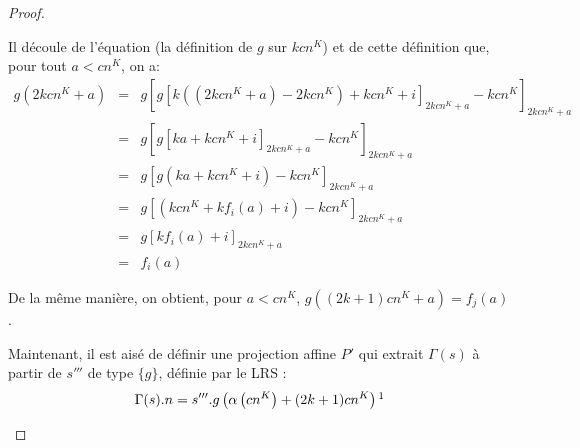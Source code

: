 \documentclass{article}
\begin{document}
\begin{proof}
\begin{enumerate}[itemsep=-1mm,leftmargin=2cm]
					Il découle de l'équation \redtext{$(\star)$} (la définition de $g$ sur $kcn^K$) et de cette définition que, pour tout $a < cn^K$, on a\footnotemark :
					\setcounter{equation}{0}
					\begin{eqnarray}
						g\left( 2kcn^K + a\right)	& = & 		g\left[ g\left[ k\left( \left(2kcn^K + a\right) - 2kcn^K \right) + kcn^K  + i\right]_{2kcn^K + a} - kcn^K  \right]_{2kcn^K + a} \\
													& = & 		g\left[ g\left[ k a + kcn^K  + i\right]_{2kcn^K + a} - kcn^K  \right]_{2kcn^K + a} \\
													& = & 		g\left[ g\left( k a + kcn^K  + i\right) - kcn^K  \right]_{2kcn^K + a} \\
													& = & 		g\left[ \left(kcn^K  +  k f_i(a) + i\right) - kcn^K  \right]_{2kcn^K + a} \\
													& = & 		g\left[ k f_i(a) + i \right]_{2kcn^K + a} \\
													& = & 		f_i(a)
					\end{eqnarray}
					
					De la même manière, on obtient, pour $a < cn^K$, $g\left( (2k+1)cn^K + a\right) = f_j(a)$. 
					
					Maintenant, il est aisé de définir une projection affine $P'$ qui extrait $\Gamma(s)$ à partir de $s'''$ de type $\{g\}$, définie par le LRS :
					\[
						\Gamma(s).n = s'''.g\left( \alpha\left( cn^K\right) + (2k+1)cn^K\right) \footnotemark
					\]
					
					

\end{enumerate}
\end{proof}
\end{document}
